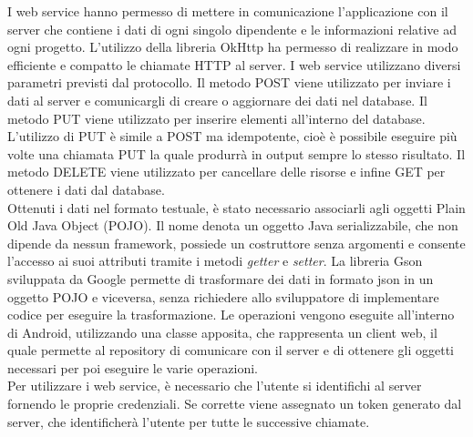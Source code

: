 \documentclass[12pt]{report}
\begin{document}
	
I web service hanno permesso di mettere in comunicazione l'applicazione con il server che contiene i dati di ogni singolo dipendente e le informazioni relative ad ogni progetto. L'utilizzo della libreria OkHttp ha permesso di realizzare in modo efficiente e compatto le chiamate HTTP al server. I web service utilizzano diversi parametri previsti dal protocollo. Il metodo POST viene utilizzato per inviare i dati al server e comunicargli di creare o aggiornare dei dati nel database. Il metodo PUT viene utilizzato per inserire elementi all'interno del database. L'utilizzo di PUT è simile a POST ma idempotente, cioè è possibile eseguire più volte una chiamata PUT la quale produrrà in output sempre lo stesso risultato. Il metodo DELETE viene utilizzato per cancellare delle risorse e infine GET per ottenere i dati dal database.\\
Ottenuti i dati nel formato testuale, è stato necessario associarli agli oggetti Plain Old Java Object (POJO). Il nome denota un oggetto Java serializzabile, che non dipende da nessun framework, possiede un costruttore senza argomenti e consente l'accesso ai suoi attributi tramite i metodi \textit{getter} e \textit{setter}. La libreria Gson sviluppata da Google permette di trasformare dei dati in formato json in un oggetto POJO e viceversa, senza richiedere allo sviluppatore di implementare codice per eseguire la trasformazione. Le operazioni vengono eseguite all'interno di Android, utilizzando una classe apposita, che rappresenta un client web, il quale permette al repository di comunicare con il server e di ottenere gli oggetti necessari per poi eseguire le varie operazioni.\\
Per utilizzare i web service, è necessario che l'utente si identifichi al server fornendo le proprie credenziali. Se corrette viene assegnato un token generato dal server, che identificherà l'utente per tutte le successive chiamate.
\end{document}

